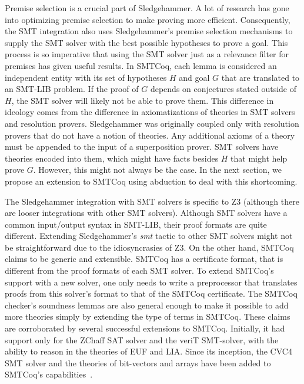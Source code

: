 \documentclass{article}
\begin{document}
	Premise selection is a crucial part of Sledgehammer. A lot 
	of research has gone into optimizing premise selection to 
	make proving more efficient. Consequently, the SMT 
	integration also uses Sledgehammer's premise selection 
	mechanisms to supply the SMT solver with the best 
	possible hypotheses to prove a goal. This process is 
	so imperative that using the SMT solver just as a 
	relevance filter for premises has given useful 
	results. In SMTCoq, each lemma is considered an 
	independent entity with its set of hypotheses $H$ and 
	goal $G$ that are translated to an SMT-LIB problem. 
	If the proof of $G$ depends on conjectures stated
	outside of $H$, the SMT solver will likely not be 
	able to prove them. This difference in 
	ideology comes from the difference in axiomatizations
	of theories in SMT solvers and resolution provers. 
	Sledgehammer was originally coupled only 
	with resolution provers that do not have a notion of 
	theories. Any additional axioms of a theory 
	must be appended to the input of a superposition 
	prover. SMT solvers have theories encoded into them, 
	which might have facts besides $H$ that might help 
	prove $G$. However, this might not always be the case.
	In the next section, we propose an extension to SMTCoq 
	using abduction to deal with this shortcoming.
	
	The Sledgehammer integration with SMT solvers is 
	specific to Z3 (although there are looser integrations 
	with other SMT solvers). Although SMT solvers have 
	a common input/output syntax in SMT-LIB, their 
	proof formats are quite different. Extending 
	Sledgehammer's \textit{smt} tactic to other 
	SMT solvers might not be straightforward due to 
	the idiosyncrasies of Z3. On the other hand, SMTCoq
	claims to be generic and extensible. SMTCoq has a 
	certificate format, that is different from the proof 
	formats of each SMT solver. To extend SMTCoq's 
	support with a new solver, one only needs to 
	write a preprocessor that translates proofs from 
	this solver's format to that of the SMTCoq certificate.
	The SMTCoq checker's soundness lemmas are also 
	general enough to make it possible to add more 
	theories simply by extending the type of terms 
	in SMTCoq. These claims are corroborated
	by several successful extensions to SMTCoq. Initially, 
	it had support only for the ZChaff SAT solver and 
	the veriT SMT-solver, with the ability to reason 
	in the theories of EUF and LIA. Since its inception, 
	the CVC4 SMT solver and the theories of bit-vectors 
	and arrays have been added to SMTCoq's
	capabilities~\cite{DBLP:journals/corr/EkiciKKMRT16}.
\end{document}
